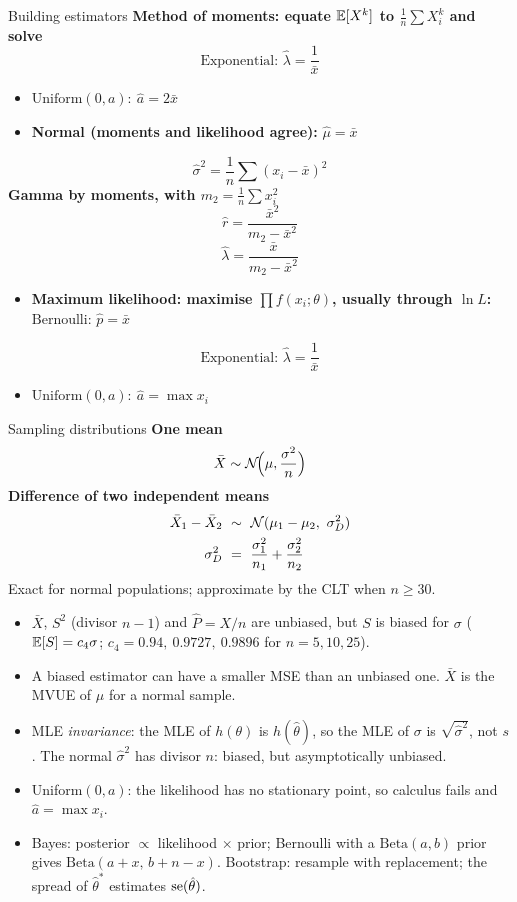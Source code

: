 \begin{formulabox}{Building estimators}
\textbf{Method of moments: equate $\mathbb{E}[X^k]$ to $\frac1n\sum X_i^k$ and solve}
\[ \text{Exponential: }\hat\lambda=\frac1{\bar{x}} \]
\begin{itemize}
  \item $\text{Uniform}(0,a):\ \hat{a}=2\bar{x}$
  \item \textbf{Normal (moments and likelihood agree):} $\hat\mu=\bar{x}$
\end{itemize}
\[ \hat\sigma^2=\frac1n\sum(x_i-\bar{x})^2 \]
\textbf{Gamma by moments, with $m_2=\frac1n\sum x_i^2$}
\[ \hat{r}=\frac{\bar{x}^2}{m_2-\bar{x}^2} \]
\[ \hat\lambda=\frac{\bar{x}}{m_2-\bar{x}^2} \]
\begin{itemize}
  \item \textbf{Maximum likelihood: maximise $\prod f(x_i;\theta)$, usually through $\ln L$:} $\text{Bernoulli: }\hat{p}=\bar{x}$
\end{itemize}
\[ \text{Exponential: }\hat\lambda=\frac1{\bar{x}} \]
\begin{itemize}
  \item $\text{Uniform}(0,a):\ \hat{a}=\max x_i$
\end{itemize}
\end{formulabox}

\begin{formulabox}{Sampling distributions}
\textbf{One mean}
\[ \bar{X}\sim\mathcal{N}\!\Big(\mu,\frac{\sigma^2}{n}\Big) \]
\textbf{Difference of two independent means}
\[ \begin{aligned}\bar{X}_1-\bar{X}_2\ &\sim\ \Normal(\mu_1-\mu_2,\ \sigma_D^2)\\ \sigma_D^2\ &=\ \frac{\sigma_1^2}{n_1}+\frac{\sigma_2^2}{n_2}\end{aligned} \]
Exact for normal populations; approximate by the CLT when $n\ge30$.
\end{formulabox}

\begin{notebox}
\begin{itemize}
  \item $\bar{X}$, $S^2$ (divisor $n-1$) and $\hat{P}=X/n$ are unbiased, but $S$ is biased for $\sigma$ ($\mathbb{E}[S]=c_4\sigma$; $c_4=0.94,\ 0.9727,\ 0.9896$ for $n=5,10,25$).
  \item A biased estimator can have a smaller MSE than an unbiased one. $\bar{X}$ is the MVUE of $\mu$ for a normal sample.
  \item MLE \emph{invariance}: the MLE of $h(\theta)$ is $h(\hat\theta)$, so the MLE of $\sigma$ is $\sqrt{\hat\sigma^2}$, not $s$. The normal $\hat\sigma^2$ has divisor $n$: biased, but asymptotically unbiased.
  \item Uniform$(0,a)$: the likelihood has no stationary point, so calculus fails and $\hat{a}=\max x_i$.
  \item Bayes: posterior $\propto$ likelihood $\times$ prior; Bernoulli with a $\mathrm{Beta}(a,b)$ prior gives $\mathrm{Beta}(a+x,\,b+n-x)$. Bootstrap: resample with replacement; the spread of $\hat\theta^*$ estimates $\operatorname{se}(\hat\theta)$.
\end{itemize}
\end{notebox}

